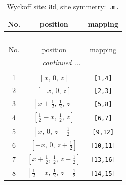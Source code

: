 \documentclass[fleqn,8pt]{jsarticle}
\begin{document}
\begin{longtable}{ccc}
\caption{Wyckoff site: {\tt 8d}, site symmetry: {\tt .m.}}
 \\
 \hline \hline
No. & position & mapping \\ \hline \endfirsthead

\multicolumn{2}{l}{\tablename\ \thetable{}} \\
 \hline \hline
No. & position & mapping \\ \hline \endhead

 \hline \hline
\multicolumn{2}{r}{\footnotesize\it continued ...} \\ \endfoot

 \hline \hline
\multicolumn{2}{r}{} \\ \endlastfoot

1 & $\left[ x,\, 0,\, z \right]$ & {\tt [1,4]} \\ \hline
2 & $\left[ - x,\, 0,\, z \right]$ & {\tt [2,3]} \\ \hline
3 & $\left[ x + \frac{1}{2},\, \frac{1}{2},\, z \right]$ & {\tt [5,8]} \\ \hline
4 & $\left[ \frac{1}{2} - x,\, \frac{1}{2},\, z \right]$ & {\tt [6,7]} \\ \hline
5 & $\left[ x,\, 0,\, z + \frac{1}{2} \right]$ & {\tt [9,12]} \\ \hline
6 & $\left[ - x,\, 0,\, z + \frac{1}{2} \right]$ & {\tt [10,11]} \\ \hline
7 & $\left[ x + \frac{1}{2},\, \frac{1}{2},\, z + \frac{1}{2} \right]$ & {\tt [13,16]} \\ \hline
8 & $\left[ \frac{1}{2} - x,\, \frac{1}{2},\, z + \frac{1}{2} \right]$ & {\tt [14,15]} \\
\end{longtable}
\renewcommand{\arraystretch}{1.2}
\end{document}
